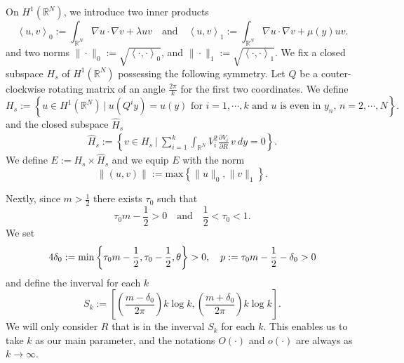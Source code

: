 \documentclass{amsart}
\theoremstyle{definition}
\theoremstyle{remark}
\numberwithin{equation}{section}
\begin{document}
On $H^1( \mathbb{R}^N)$, we introduce two inner products
$$ \left<u,v\right>_0:= \int_{ \mathbb{R}^N} \nabla u\cdot\nabla v + \lambda uv \quad \text{and} \quad \left<u,v\right>_1:= \int_{ \mathbb{R}^N} \nabla u\cdot\nabla v + \mu(y) uv.$$ and two norms $\|\cdot\|_0:=\sqrt{\left<\cdot,\cdot\right>_0}$, and $\|\cdot\|_1:=\sqrt{\left<\cdot,\cdot\right>_1}$. We fix a closed subspace $H_s$ of $H^1( \mathbb{R}^N)$ possessing the following symmetry. Let $Q$ be a couter-clockwise rotating matrix of an angle $\frac{2\pi}{k}$ for the first two coordinates. We define 
\begin{equation*}
 H_s:= \left\{ u \in H^1 (\mathbb{R}^N) ~\Big|~ \text{$u(Q^iy) = u(y)$ for $i=1,\cdots,k$ and $u$ is even in $y_n$, $n=2,\cdots,N$}\right\}.
\end{equation*}
and the closed subspace $\hat{H}_s$
\begin{equation}
 \begin{aligned} 
    \hat{H}_s:= \left\{ v \in H_s ~\Big|~  \sum_{i=1}^k\int_{\mathbb{R}^N}  V_{i}^2 \frac{\partial V_{i}}{\partial R} \,v~dy = 0 \right\}.
 \end{aligned}
\end{equation}
We define $E:= H_s \times \hat{H}_s$ and we equip $E$ with the norm \[\|(u,v)\|:= \mbox{max} \left\{ \| u\|_0, \| v\|_1\right\}.\] %

Nextly, since $m> \frac{1}{2}$ there exists $\tau_0$ such that 
$$\tau_0 m - \frac{1}{2} > 0 \quad \text{and} \quad \frac{1}{2} < \tau_0 < 1.$$ We set 
\begin{equation} \label{delta0}
4\delta_0:= {\rm min} \left\{ \tau_0m - \frac{1}{2}, \tau_0 - \frac{1}{2}, \theta \right\}>0, \quad  p:= \tau_0m - \frac{1}{2} - \delta_0 > 0
\end{equation} 
and define the inverval for each $k$
\begin{equation}\label{sk}{S_k:=\left[\left(\frac{m - \delta_0}{2\pi} \right)k\log k,\left(\frac{m+\delta_0}{2\pi}\right)k\log k\right]}.%
\end{equation}
We will only consider $R$ that is in the inverval $S_k$ for each $k$. This enables us to take $k$ as our main parameter, and the notations ${O(\cdot)}$ and $o(\cdot)$ are always as $k \rightarrow \infty$.
\end{document}
